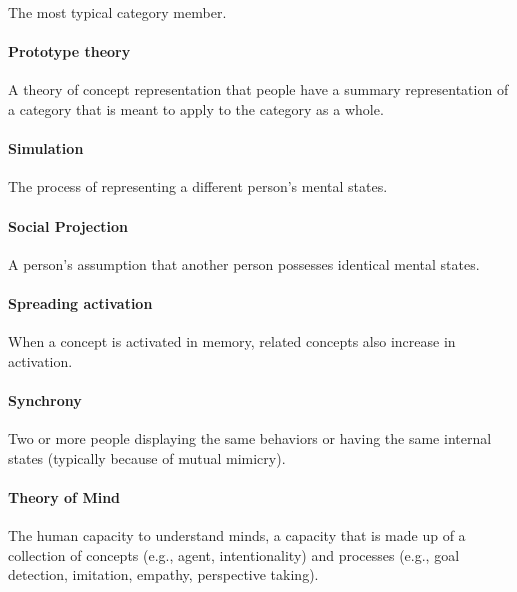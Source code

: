 \documentclass[
]{krantz}
\begin{document}
The most typical category member.

\paragraph*{Prototype theory}\label{prototype-theory}

A theory of concept representation that people have a summary representation of a category that is meant to apply to the category as a whole.

\paragraph*{Simulation}\label{simulation}

The process of representing a different person's mental states.

\paragraph*{Social Projection}\label{social-projection}

A person's assumption that another person possesses identical mental states.

\paragraph*{Spreading activation}\label{spreading-activation}

When a concept is activated in memory, related concepts also increase in activation.

\paragraph*{Synchrony}\label{synchrony}

Two or more people displaying the same behaviors or having the same internal states (typically because of mutual mimicry).

\paragraph*{Theory of Mind}\label{theory-of-mind}

The human capacity to understand minds, a capacity that is made up of a collection of concepts (e.g., agent, intentionality) and processes (e.g., goal detection, imitation, empathy, perspective taking).
\end{document}
